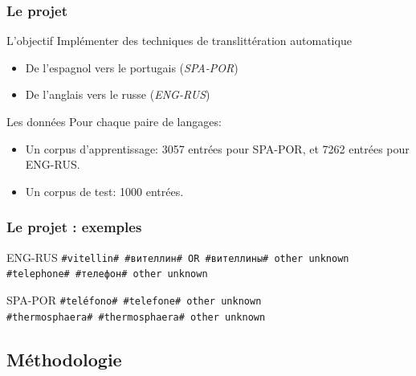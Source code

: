 \documentclass{beamer}
\begin{document}
\begin{frame}
\frametitle{Le projet}

	\begin{block}{L'objectif}
		Implémenter des techniques de translittération automatique
		\begin{itemize}
            \item De l'espagnol vers le portugais (\emph{SPA-POR})
            \item De l'anglais vers le russe (\emph{ENG-RUS})
		\end{itemize}
	\end{block}

	\begin{block}{Les données}
	Pour chaque paire de langages:		
		\begin{itemize}
            \item Un corpus d'apprentissage: 3057 entrées pour SPA-POR, et 7262 entrées pour ENG-RUS.
		\item Un corpus de test: 1000 entrées.
		\end{itemize}		
	\end{block}

\end{frame}

\begin{frame}[fragile]
\frametitle{Le projet : exemples}
\begin{block}{ENG-RUS}
\foreignlanguage{russian}{
\texttt{\#vitellin\# \#вителлин\# OR \#вителлины\#	other unknown}\\
\texttt{\#telephone\# \#телефон\# other unknown} }
\end{block}
\begin{block}{SPA-POR}
\texttt{\#teléfono\# \#telefone\#	other	unknown}\\
\texttt{\#thermosphaera\# \#thermosphaera\#	other	unknown}
\end{block}
\end{frame}


\subsection{Méthodologie}
\end{document}
